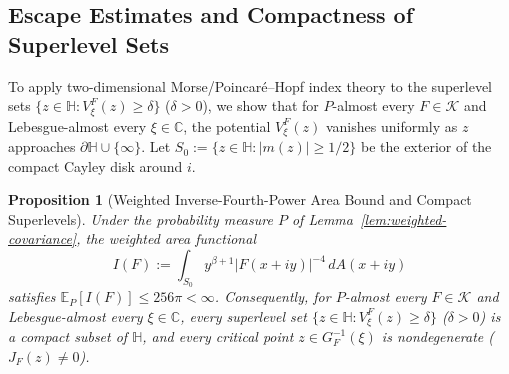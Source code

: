 \documentclass[12pt]{article}
\def\C{\mathbb{C}}
\def\H{\mathbb{H}}
\def\K{\mathcal{K}}
\def\E{\mathbb{E}}
\newtheorem{prop}[thm]{Proposition}
\theoremstyle{definition}
\numberwithin{equation}{section}
\begin{document}
\subsection{Escape Estimates and Compactness of Superlevel Sets}

To apply two-dimensional Morse/Poincar\'e--Hopf index theory to the superlevel sets $\{z \in \H : V_\xi^F(z) \ge \delta\}$ ($\delta > 0$), we show that for $P$-almost every $F \in \K$ and Lebesgue-almost every $\xi \in \C$, the potential $V_\xi^F(z)$ vanishes uniformly as $z$ approaches $\partial \H \cup \{\infty\}$. Let $S_0 := \{z \in \H : |m(z)| \ge 1/2\}$ be the exterior of the compact Cayley disk around $i$.

\begin{prop}[Weighted Inverse-Fourth-Power Area Bound and Compact Superlevels]\label{prop:escape}
Under the probability measure $P$ of Lemma~\ref{lem:weighted-covariance}, the weighted area functional
\begin{equation}\label{eq:IF-def}
  I(F) := \int_{S_0} y^{\beta + 1} |F(x + iy)|^{-4} \, dA(x + iy)
\end{equation}
satisfies $\E_P[I(F)] \le 256\pi < \infty$. Consequently, for $P$-almost every $F \in \K$ and Lebesgue-almost every $\xi \in \C$, every superlevel set $\{z \in \H : V_\xi^F(z) \ge \delta\}$ ($\delta > 0$) is a compact subset of $\H$, and every critical point $z \in G_F^{-1}(\xi)$ is nondegenerate ($J_F(z) \ne 0$).
\end{prop}
\end{document}

